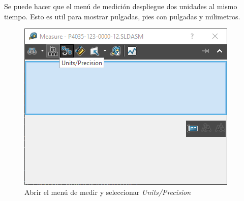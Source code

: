 \documentclass{report}
\begin{document}
Se puede hacer que el menú de medición despliegue dos unidades al mismo tiempo. Esto es util para mostrar pulgadas, pies con pulgadas y milimetros.

\begin{figure}[H]
	\centering
	\includegraphics[width=0.55\linewidth, height=0.35\textheight,keepaspectratio]{Imagenes/solidworks_dual_units01}
	\caption{Abrir el menú de medir y seleccionar \emph{Units/Precision}}
	\label{fig:solidworksdualunits01}
\end{figure}
\end{document}
